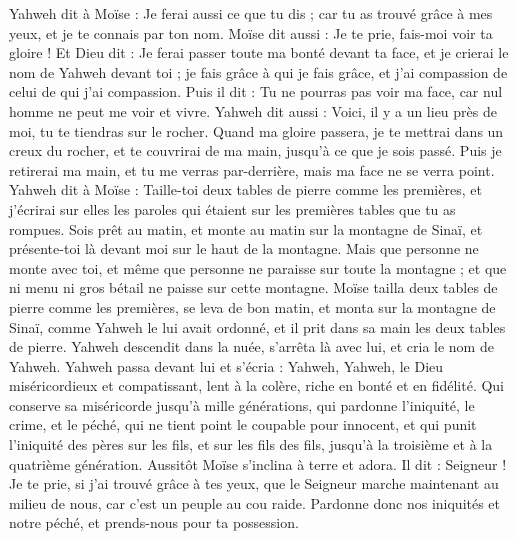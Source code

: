 \begin{multicols}{2}
Yahweh dit à Moïse : Je ferai aussi ce que tu dis ; car tu as trouvé grâce à mes yeux, et je te connais par ton nom.
Moïse dit aussi : Je te prie, fais-moi voir ta gloire !
Et Dieu dit : Je ferai passer toute ma bonté devant ta face, et je crierai le nom de Yahweh devant toi ; je fais grâce à qui je fais grâce, et j'ai compassion de celui de qui j'ai compassion.
Puis il dit : Tu ne pourras pas voir ma face, car nul homme ne peut me voir et vivre.
Yahweh dit aussi : Voici, il y a un lieu près de moi, tu te tiendras sur le rocher.
Quand ma gloire passera, je te mettrai dans un creux du rocher, et te couvrirai de ma main, jusqu’à ce que je sois passé.
Puis je retirerai ma main, et tu me verras par-derrière, mais ma face ne se verra point.
\VerseOne{}Yahweh dit à Moïse : Taille-toi deux tables de pierre comme les premières, et j'écrirai sur elles les paroles qui étaient sur les premières tables que tu as rompues.
Sois prêt au matin, et monte au matin sur la montagne de Sinaï, et présente-toi là devant moi sur le haut de la montagne.
Mais que personne ne monte avec toi, et même que personne ne paraisse sur toute la montagne ; et que ni menu ni gros bétail ne paisse sur cette montagne.
Moïse tailla deux tables de pierre comme les premières, se leva de bon matin, et monta sur la montagne de Sinaï, comme Yahweh le lui avait ordonné, et il prit dans sa main les deux tables de pierre.
Yahweh descendit dans la nuée, s'arrêta là avec lui, et cria le nom de Yahweh.
Yahweh passa devant lui et s’écria : Yahweh, Yahweh, le Dieu miséricordieux et compatissant, lent à la colère, riche en bonté et en fidélité.
Qui conserve sa miséricorde jusqu’à mille générations, qui pardonne l'iniquité, le crime, et le péché, qui ne tient point le coupable pour innocent, et qui punit l'iniquité des pères sur les fils, et sur les fils des fils, jusqu’à la troisième et à la quatrième génération.
Aussitôt Moïse s’inclina à terre et adora.
Il dit : Seigneur ! Je te prie, si j'ai trouvé grâce à tes yeux, que le Seigneur marche maintenant au milieu de nous, car c'est un peuple au cou raide. Pardonne donc nos iniquités et notre péché, et prends-nous pour ta possession.

\end{multicols}
